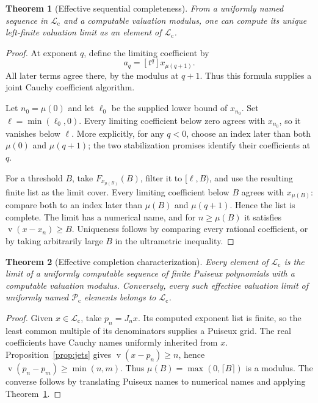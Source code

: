 \documentclass[11pt,letterpaper]{article}
\numberwithin{equation}{section}
\newtheorem{theorem}{Theorem}[section]
\theoremstyle{definition}
\theoremstyle{remark}
\newcommand{\Lc}{\mathcal L_{\mathrm c}}
\newcommand{\Pc}{\mathcal P_{\mathrm c}}
\newcommand{\val}{\operatorname{v}}
\newcommand{\coef}[2]{[t^{#1}]#2}
\begin{document}
\begin{theorem}[Effective sequential completeness]
\label{thm:completion}
From a uniformly named sequence in $\Lc$ and a computable valuation
modulus, one can compute its unique left-finite valuation limit as an
element of $\Lc$.
\end{theorem}
\begin{proof}
At exponent $q$, define the limiting coefficient by
\begin{equation}\label{eq:limcoef}
 a_q=\coef q{x_{\mu(q+1)}}.
\end{equation}
All later terms agree there, by the modulus at $q+1$. Thus this formula
supplies a joint Cauchy coefficient algorithm.

Let $n_0=\mu(0)$ and let $\ell_0$ be the supplied lower bound of $x_{n_0}$.
Set $\ell=\min(\ell_0,0)$. Every limiting coefficient below zero agrees
with $x_{n_0}$, so it vanishes below $\ell$. More explicitly, for any
$q<0$, choose an index later than both $\mu(0)$ and $\mu(q+1)$; the two
stabilization promises identify their coefficients at $q$.

For a threshold $B$, take $F_{x_{\mu(B)}}(B)$, filter it to $[\ell,B)$,
and use the resulting finite list as the limit cover. Every limiting
coefficient below $B$ agrees with $x_{\mu(B)}$: compare both to an index
later than $\mu(B)$ and $\mu(q+1)$. Hence the list is complete. The limit
has a numerical name, and for $n\ge\mu(B)$ it satisfies
$\val(x-x_n)\ge B$. Uniqueness follows by comparing every rational
coefficient, or by taking arbitrarily large $B$ in the ultrametric
inequality.
\end{proof}

\begin{theorem}[Effective completion characterization]
\label{thm:completioncharacter}
Every element of $\Lc$ is the limit of a uniformly computable sequence
of finite Puiseux polynomials with a computable valuation modulus.
Conversely, every such effective valuation limit of uniformly named
$\Pc$ elements belongs to $\Lc$.
\end{theorem}
\begin{proof}
Given $x\in\Lc$, take $p_n=J_nx$. Its computed exponent list is finite,
so the least common multiple of its denominators supplies a Puiseux grid.
The real coefficients have Cauchy names uniformly inherited from $x$.
Proposition~\ref{prop:jets} gives $\val(x-p_n)\ge n$, hence
$\val(p_n-p_m)\ge\min(n,m)$. Thus
$\mu(B)=\max(0,\lceil B\rceil)$ is a modulus. The converse follows by
translating Puiseux names to numerical names and applying
Theorem~\ref{thm:completion}.
\end{proof}
\end{document}
